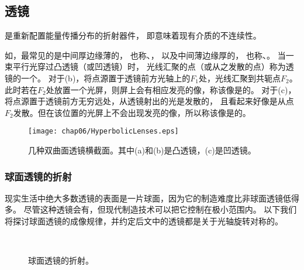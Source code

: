 \subsection{透镜}\label{sub:透镜}
\begin{definition}
    是重新配置能量传播分布的折射器件，
    即意味着现有介质的不连续性。
\end{definition}

如，最常见的是中间厚边缘薄的，
也称、，
以及中间薄边缘厚的，
也称、。
当一束平行光穿过凸透镜（或凹透镜）时，
光线汇聚的点（或从之发散的点）称为透镜的一个。
对于(b)，将点源置于透镜前方光轴上的$F_1$处，光线汇聚到共轭点$F_2$。
此时若在$F_2$处放置一个光屏，则屏上会有相应发亮的像，称该像是的。
对于(c)，将点源置于透镜前方无穷远处，从透镜射出的光是发散的，
且看起来好像是从点$F_2$发散。但在该位置的光屏上不会出现发亮的像，所以称该像是的。
\begin{figure}[htbp]
    \centering\texttt{[image: chap06/HyperbolicLenses.eps]}
    \caption{几种双曲面透镜横截面。其中(a)和(b)是凸透镜，(c)是凹透镜。}
    \label{fig:6.30}
\end{figure}

\subsubsection{球面透镜的折射}
现实生活中绝大多数透镜的表面是一片球面，因为它的制造难度比非球面透镜低得多。
尽管这种透镜会有，但现代制造技术可以把它控制在极小范围内。
以下我们将探讨球面透镜的成像规律，并约定后文中的透镜都是关于光轴旋转对称的。
\begin{figure}[htbp]
    \centering
    \,
    \caption{球面透镜的折射。}
    \label{fig:6.31}
\end{figure}


